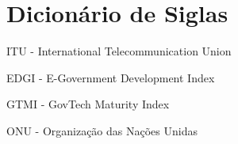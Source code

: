 \section{Dicionário de Siglas}

ITU - International Telecommunication Union

EDGI - E-Government Development Index

GTMI - GovTech Maturity Index

ONU - Organização das Nações Unidas